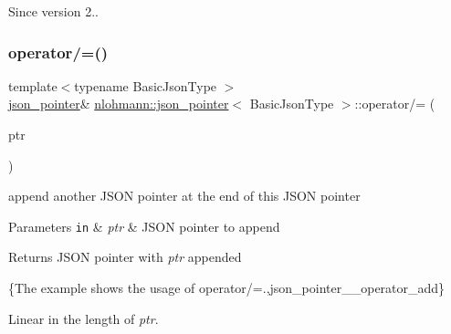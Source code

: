 \begin{DoxySince}{Since}
version 2.. 
\end{DoxySince}
\mbox{\label{classnlohmann_1_1json__pointer_a7395bd0af29ac23fd3f21543c935cdfa}} 
\subsubsection{\texorpdfstring{operator/=()}{operator/=()}\hspace{0.1cm}{\footnotesize\ttfamily [1/3]}}
{\footnotesize\ttfamily template$<$typename Basic\+Json\+Type $>$ \\
\mbox{\hyperlink{classnlohmann_1_1json__pointer}{json\+\_\+pointer}}\& \mbox{\hyperlink{classnlohmann_1_1json__pointer}{nlohmann\+::json\+\_\+pointer}}$<$ Basic\+Json\+Type $>$\+::operator/= (\begin{DoxyParamCaption}\item[{const \mbox{\hyperlink{classnlohmann_1_1json__pointer}{json\+\_\+pointer}}$<$ Basic\+Json\+Type $>$ \&}]{ptr }\end{DoxyParamCaption})\hspace{0.3cm}{\ttfamily [inline]}}



append another J\+S\+ON pointer at the end of this J\+S\+ON pointer 


\begin{DoxyParams}[1]{Parameters}
\mbox{\tt in}  & {\em ptr} & J\+S\+ON pointer to append \\
\hline
\end{DoxyParams}
\begin{DoxyReturn}{Returns}
J\+S\+ON pointer with {\itshape ptr} appended
\end{DoxyReturn}
\{The example shows the usage of {\ttfamily operator/=}.,json\+\_\+pointer\+\_\+\+\_\+operator\+\_\+add\}

Linear in the length of {\itshape ptr}.

